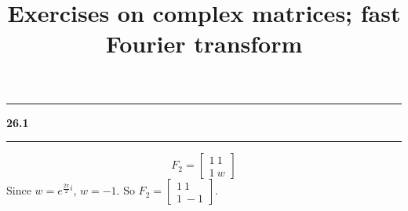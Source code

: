 \documentclass[11pt]{article}
\newcommand\question[2]{\vspace{.25in}\hrule\textbf{#1 #2}\vspace{.5em}\hrule\vspace{.10in}}
\begin{document}
\raggedright
\newcommand\NAME{Haiying Cui}  %
\newcommand\ANDREWID{Christy}     %
\newcommand\HWNUM{25}              %

\title{Exercises on complex matrices; fast Fourier transform}
\maketitle

\question{26.1}{}
$$F_2 = \begin{bmatrix} 1 \ 1 \\ 1 \ w \end{bmatrix}$$
Since \(w = e^{\frac{2\pi}{2}i}\), \(w = -1\). So \(F_2 = \begin{bmatrix} 1 \ 1 \\ 1 \ -1 \end{bmatrix}\).
\end{document}
